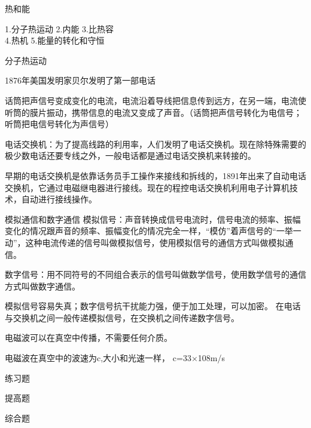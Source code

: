 \documentclass[12pt]{exam}
\newcommand{\keti}{热和能}
\newcommand{\zhongdian}{1.分子热运动 2.内能 3.比热容\\  4.热机 5.能量的转化和守恒}
\renewcommand{\section}[1]{{\large\sffamily  #1} \par}
\begin{document}
\vspace*{80pt}
\keti \par
\zhongdian \par
\section{分子热运动}
1876年美国发明家贝尔发明了第一部电话

话筒把声信号变成变化的电流，电流沿着导线把信息传到远方，在另一端，电流使听筒的膜片振动，携带信息的电流又变成了声音。（话筒把声信号转化为电信号；听筒把电信号转化为声信号）

电话交换机：为了提高线路的利用率，人们发明了电话交换机。现在除特殊需要的极少数电话还要专线之外，一般电话都是通过电话交换机来转接的。

早期的电话交换机是依靠话务员手工操作来接线和拆线的，1891年出来了自动电话交换机，它通过电磁继电器进行接线。现在的程控电话交换机利用电子计算机技术，自动进行接线操作。

模拟通信和数字通信
模拟信号：声音转换成信号电流时，信号电流的频率、振幅变化的情况跟声音的频率、振幅变化的情况完全一样，“模仿”着声信号的“一举一动”，这种电流传递的信号叫做模拟信号，使用模拟信号的通信方式叫做模拟通信。

数字信号：用不同符号的不同组合表示的信号叫做数学信号，使用数学信号的通信方式叫做数字通信。

模拟信号容易失真；数字信号抗干扰能力强，便于加工处理，可以加密。
在电话与交换机之间一般传递模拟信号，在交换机之间传递数字信号。



电磁波可以在真空中传播，不需要任何介质。

电磁波在真空中的波速为c,大小和光速一样， c=$3$3×108m/s 

\section{练习题}














\begin{improveexercises}
\section{提高题}

\end{improveexercises}

\begin{advanceexercises}
\section{综合题}

\end{advanceexercises}

\end{document}
